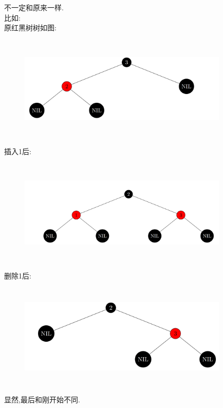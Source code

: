 \documentclass[a4paper, justified]{tufte-handout}
\begin{document}
\begin{solution}
  不一定和原来一样.\\
  比如:\\
  原红黑树树如图:\\
  \begin{figure}
    \centering
    \includegraphics[width=10cm,height=5cm]{pic1.png}
  \end{figure}
  插入1后:
  \begin{figure}
    \centering
    \includegraphics[width=10cm,height=5cm]{pic2.png}
  \end{figure}
  删除1后:
  \begin{figure}
    \centering
    \includegraphics[width=10cm,height=5cm]{pic3.png}
  \end{figure}
  显然,最后和刚开始不同.
\end{solution}

\beginoptional

\begin{problem}
\end{problem}
\end{document}

